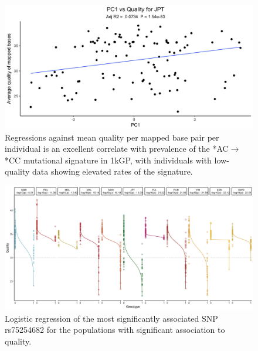 \documentclass[9pt,lineno]{elife}
\begin{document}
\begin{figure}
\includegraphics[width=\hsize,keepaspectratio]{./Figures/PC1_Correlation.jpg}
\caption{Regressions against mean quality per mapped base pair per individual is an excellent correlate with prevalence of the  *AC${\rightarrow}$*CC mutational signature in 1kGP, with individuals with low-quality data showing elevated rates of the signature.  }
\label{PC1_Correlation}
\end{figure}

\begin{figure}
\includegraphics[width=\hsize,keepaspectratio]{./Figures/RegressionPlot_mostSig2.jpg}
\caption{Logistic regression of the most significantly associated SNP rs75254682 for the populations with significant association to quality.}
\label{MostSig}
\end{figure}
\end{document}
